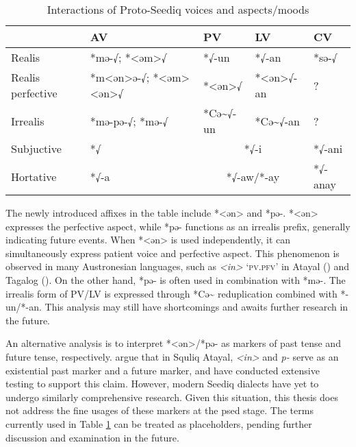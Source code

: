 \begin{table}[!htbp]
\centering
\caption{Interactions of Proto-Seediq voices and aspects/moods}
\label{tab:psed_voice_tam}
\begin{tabular}{lllll}
\hline
                  & AV                    & PV            & LV             & CV      \\ \hline
Realis            & *mə-√; *<əm>√         & *√-un         & *√-an          & *sə-√   \\
Realis perfective & *m<ən>ə-√; *<əm><ən>√ & *<ən>√        & *<ən>√-an      & ?       \\
Irrealis          & *mə-pə-√; *mə-√       & *Cə\~{}√-un   & *Cə\~{}√-an    & ?       \\
Subjuctive        & *√                    & \multicolumn{2}{c}{*√-i}       & *√-ani  \\
Hortative         & *√-a                  & \multicolumn{2}{c}{*√-aw/*-ay} & *√-anay \\ \hline
\end{tabular}
\end{table}

The newly introduced affixes in the table include *<ən> and *pə-. *<ən> expresses the perfective aspect, while *pə- functions as an irrealis prefix, generally indicating future events. When *<ən> is used independently, it can simultaneously express patient voice and perfective aspect. This phenomenon is observed in many Austronesian languages, such as \textit{<in>} `\textsc{pv.pfv}' in Atayal (\cite{huang1995}) and Tagalog (\cite{schachter_otanes1972tagalog}). On the other hand, *pə- is often used in combination with *mə-. The irrealis form of PV/LV is expressed through *Cə\~{} reduplication combined with *-un/*-an. This analysis may still have shortcomings and awaits further research in the future.

An alternative analysis is to interpret *<ən>/*pə- as markers of past tense and future tense, respectively. \textcite{chen2018, chen2024} argue that in Squliq Atayal, \textit{<in>} and \textit{p-} serve as an existential past marker and a future marker, and have conducted extensive testing to support this claim. However, modern Seediq dialects have yet to undergo similarly comprehensive research. Given this situation, this thesis does not address the fine usages of these markers at the \acl{psed} stage. The terms currently used in Table \ref{tab:psed_voice_tam} can be treated as placeholders, pending further discussion and examination in the future.

